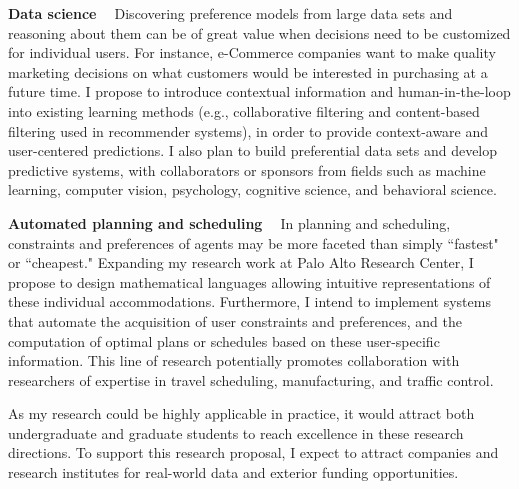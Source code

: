 \documentclass[11pt]{article}
\begin{document}
\smallskip \noindent \textbf{Data science \  } Discovering preference 
models from large data sets and reasoning about them 
can be of great value when decisions need to be customized for individual users.
For instance, e-Commerce companies want to make quality marketing decisions
on what customers would be interested in purchasing at a future time.
I propose to introduce contextual information and human-in-the-loop into existing learning methods
(e.g., collaborative filtering and content-based filtering used in recommender systems), 
in order to provide context-aware and user-centered predictions.
I also plan to build preferential data sets and develop predictive systems, with collaborators
or sponsors from fields 
such as machine learning, computer vision, psychology, cognitive science, and behavioral science.

\smallskip \noindent \textbf{Automated planning and scheduling \  }
In planning and scheduling, constraints and preferences of agents may be more faceted than simply
``fastest" or ``cheapest."
Expanding my research work at Palo Alto Research Center,
I propose to design mathematical languages allowing
intuitive representations of these individual accommodations. 
Furthermore, I intend to implement systems
that automate the acquisition of user constraints and preferences, and the computation of optimal plans or schedules 
based on these user-specific information.
This line of research potentially promotes collaboration with researchers of expertise in
travel scheduling, manufacturing, and traffic control.

As my research could be highly applicable in practice, it would attract both undergraduate and graduate students to
reach excellence in these research directions.
To support this research proposal,
I expect to attract companies and research institutes
for real-world data and exterior funding opportunities.


{}
\end{document}

